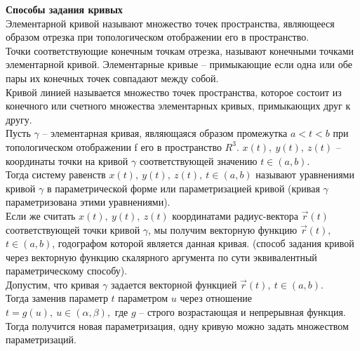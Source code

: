 \documentclass{report}
\begin{document}
\noindent
\textbf{Способы задания кривых}\\
\indent Элементарной кривой называют множество точек пространства, являющееся
образом отрезка при топологическом отображении его в пространство.\\
Точки соответствующие конечным точкам отрезка, называют конечными точками
элементарной кривой. Элементарные кривые -- примыкающие если одна или обе
пары их конечных точек совпадают между собой.\\
Кривой линией называется множество точек пространства, которое состоит
из конечного или счетного множества элементарных кривых, примыкающих друг к другу.\\
\indent Пусть $\gamma$ -- элементарная кривая, являющаяся образом промежутка 
$a < t < b$ при топологическом отображении f его в пространство $R^{3}$.
$x(t),\ y(t),\ z(t)$ -- координаты точки на кривой $\gamma$ соответствующей
значению $t \in (a, b)$.\\
Тогда систему равенств $x(t),\ y(t),\ z(t),\ t \in (a, b)$ называют уравнениями кривой 
$\gamma$ в параметрической форме или параметризацией кривой (кривая $\gamma$ параметризована
этими уравнениями).\\
Если же считать $x(t),\ y(t),\ z(t)$ координатами радиус-вектора $\overrightarrow{r}(t)$
соответствующей точки кривой $\gamma$, мы получим векторную функцию $\overrightarrow{r}(t),\ $
$t \in (a, b)$, годографом которой является данная кривая. (способ задания кривой через векторную
функцию скалярного аргумента по сути эквивалентный параметрическому способу).\\
Допустим, что кривая $\gamma$ задается векторной функцией $\overrightarrow{r}(t),\ t \in (a, b)$.\\
Тогда заменив параметр $t$ параметром $u$ через отношение $t = g(u),\ u \in (\alpha, \beta),$ где $g$
-- строго возрастающая и непрерывная функция. Тогда получится новая параметризация, одну кривую
можно задать множеством параметризаций.\\
\end{document}

